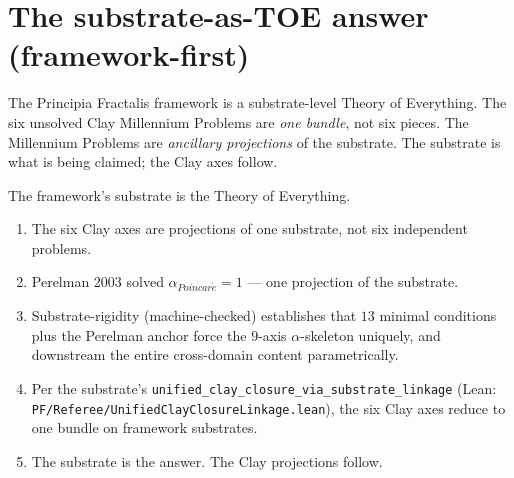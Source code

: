 \section{The substrate-as-TOE answer (framework-first)}
\label{sec:substrate-as-toe-answer}

The Principia Fractalis framework is a substrate-level Theory of
Everything. The six unsolved Clay Millennium Problems are
\emph{one bundle}, not six pieces. The Millennium Problems are
\emph{ancillary projections} of the substrate. The substrate is
what is being claimed; the Clay axes follow.

\begin{principle}
\label{prin:framework-first}
The framework's substrate is the Theory of Everything.
\begin{enumerate}
\item The six Clay axes are projections of one substrate, not
six independent problems.
\item Perelman 2003 solved $\alpha_{Poincar\acute{e}} = 1$ ---
one projection of the substrate.
\item Substrate-rigidity (machine-checked) establishes that
$13$ minimal conditions plus the Perelman anchor force the
$9$-axis $\alpha$-skeleton uniquely, and downstream the entire
cross-domain content parametrically.
\item Per the substrate's
\texttt{unified\_\allowbreak{}clay\_\allowbreak{}closure\_\allowbreak{}via\_\allowbreak{}substrate\_\allowbreak{}linkage}
(Lean: \texttt{PF/\allowbreak{}Referee/\allowbreak{}Unified\allowbreak{}Clay\allowbreak{}Closure\allowbreak{}Linkage.\allowbreak{}lean}), the
six Clay axes reduce to one bundle on framework substrates.
\item The substrate is the answer. The Clay projections follow.
\end{enumerate}
\end{principle}

